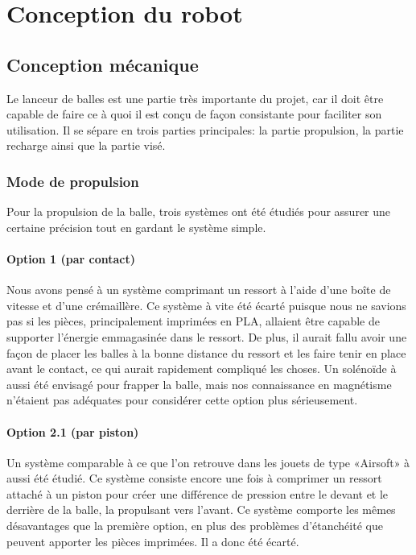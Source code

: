 \section{Conception du robot}

\subsection{Conception mécanique}

Le lanceur de balles est une partie très importante du projet,
car il doit être capable de faire ce à quoi il est conçu de façon consistante pour faciliter son utilisation.
Il se sépare en trois parties principales: la partie propulsion, la partie recharge ainsi que la partie visé.

\subsubsection{Mode de propulsion}
Pour la propulsion de la balle, trois systèmes ont été étudiés pour assurer une certaine précision tout en gardant le système simple.

\paragraph{Option 1 (par contact)}
Nous avons pensé à un système comprimant un ressort à l’aide d’une boîte de vitesse et d’une crémaillère.
Ce système à vite été écarté puisque nous ne savions pas si les pièces, principalement imprimées en PLA, allaient être capable de supporter l'énergie emmagasinée dans le ressort.
De plus, il aurait fallu avoir une façon de placer les balles à la bonne distance du ressort et les faire tenir en place avant le contact, ce qui aurait rapidement compliqué les choses.
Un solénoïde à aussi été envisagé pour frapper la balle, mais nos connaissance en magnétisme n’étaient pas adéquates pour considérer cette option plus sérieusement.

\paragraph{Option 2.1 (par piston)}
Un système comparable à ce que l’on retrouve dans les jouets de type «Airsoft» à aussi été étudié.
Ce système consiste encore une fois à comprimer un ressort attaché à un piston pour créer une différence de pression entre le devant et le derrière de la balle, la propulsant vers l’avant.
Ce système comporte les mêmes désavantages que la première option, en plus des problèmes d’étanchéité que peuvent apporter les pièces imprimées.
Il a donc été écarté.

